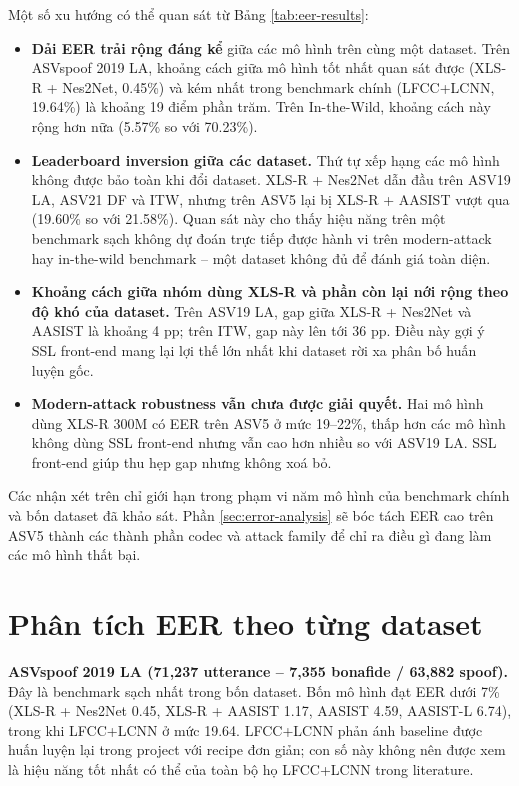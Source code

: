 Một số xu hướng có thể quan sát từ Bảng \ref{tab:eer-results}:
\begin{itemize}
    \item \textbf{Dải EER trải rộng đáng kể} giữa các mô hình trên cùng một dataset. Trên ASVspoof 2019 LA, khoảng cách giữa mô hình tốt nhất quan sát được (XLS-R + Nes2Net, 0.45\%) và kém nhất trong benchmark chính (LFCC+LCNN, 19.64\%) là khoảng 19 điểm phần trăm. Trên In-the-Wild, khoảng cách này rộng hơn nữa (5.57\% so với 70.23\%).
    \item \textbf{Leaderboard inversion giữa các dataset.} Thứ tự xếp hạng các mô hình không được bảo toàn khi đổi dataset. XLS-R + Nes2Net dẫn đầu trên ASV19 LA, ASV21 DF và ITW, nhưng trên ASV5 lại bị XLS-R + AASIST vượt qua (19.60\% so với 21.58\%). Quan sát này cho thấy hiệu năng trên một benchmark sạch không dự đoán trực tiếp được hành vi trên modern-attack hay in-the-wild benchmark -- một dataset không đủ để đánh giá toàn diện.
    \item \textbf{Khoảng cách giữa nhóm dùng XLS-R và phần còn lại nới rộng theo độ khó của dataset.} Trên ASV19 LA, gap giữa XLS-R + Nes2Net và AASIST là khoảng 4 pp; trên ITW, gap này lên tới 36 pp. Điều này gợi ý SSL front-end mang lại lợi thế lớn nhất khi dataset rời xa phân bố huấn luyện gốc.
    \item \textbf{Modern-attack robustness vẫn chưa được giải quyết.} Hai mô hình dùng XLS-R 300M có EER trên ASV5 ở mức 19--22\%, thấp hơn các mô hình không dùng SSL front-end nhưng vẫn cao hơn nhiều so với ASV19 LA. SSL front-end giúp thu hẹp gap nhưng không xoá bỏ.
\end{itemize}

Các nhận xét trên chỉ giới hạn trong phạm vi năm mô hình của benchmark chính và bốn dataset đã khảo sát. Phần \ref{sec:error-analysis} sẽ bóc tách EER cao trên ASV5 thành các thành phần codec và attack family để chỉ ra điều gì đang làm các mô hình thất bại.

\section{Phân tích EER theo từng dataset} \label{sec:dataset-analysis}

\textbf{ASVspoof 2019 LA (71,237 utterance -- 7,355 bonafide / 63,882 spoof).} Đây là benchmark sạch nhất trong bốn dataset. Bốn mô hình đạt EER dưới 7\% (XLS-R + Nes2Net 0.45, XLS-R + AASIST 1.17, AASIST 4.59, AASIST-L 6.74), trong khi LFCC+LCNN ở mức 19.64. LFCC+LCNN phản ánh baseline được huấn luyện lại trong project với recipe đơn giản; con số này không nên được xem là hiệu năng tốt nhất có thể của toàn bộ họ LFCC+LCNN trong literature.

